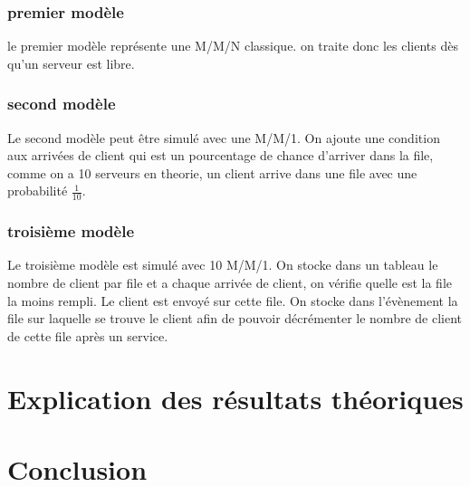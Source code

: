 \documentclass[a4paper,11pt]{article}
\begin{document}
	\subsubsection{premier modèle}
		le premier modèle représente une M/M/N classique. on traite donc les clients dès qu'un serveur est libre.
	\subsubsection{second modèle}
		Le second modèle peut être simulé avec une M/M/1. On ajoute une condition aux arrivées de client qui est un pourcentage de chance d'arriver dans la file, comme on a 10 serveurs en theorie, un client arrive dans une file avec une probabilité $\frac{1}{10}$.
	\subsubsection{troisième modèle}
		Le troisième modèle est simulé avec 10 M/M/1. On stocke dans un tableau le nombre de client par file et a chaque arrivée de client, on vérifie quelle est la file la moins rempli. Le client est envoyé sur cette file. On stocke dans l'évènement la file sur laquelle se trouve le client afin de pouvoir décrémenter le nombre de client de cette file après un service. 
	


\section{Explication des résultats théoriques}
	
\section{Conclusion}
	
\end{document}
